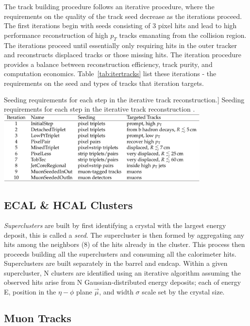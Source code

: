 The track building procedure follows an iterative procedure, where the requirements on the quality of the track seed decrease as the iterations proceed. The first iterations begin with seeds consisting of 3 pixel hits and lead to high performance reconstruction of high $p_{T}$ tracks emanating from the collision region. The iterations proceed until essentially only requiring hits in the outer tracker and reconstructs displaced tracks or those missing hits. The iteration procedure provides a balance between reconstruction efficiency, track purity, and computation economics. Table~\ref{tab:itertracks} list these iterations - the requirements on the seed and types of tracks that iteration targets.

\begin{table}[hbp!]
\caption
[Seeding requirements for each step in the iterative track reconstruction.]
{Seeding requirements for each step in the iterative track reconstruction \cite{CMS-PRF-14-001}.}
\centering
\includegraphics[width=0.8\textwidth]{figs/itertracks.png}
\label{tab:itertracks}
\end{table}

\subsection{ECAL \& HCAL Clusters}

\textit{Superclusters} are built by first identifying a crystal with the largest energy deposit, this is called a \textit{seed}. The supercluster is then formed by aggregating any hits among the neighbors (8) of the hits already in the cluster. This process then proceeds building all the superclusters and consuming all the calorimeter hits. Superclusters are built separately in the barrel and endcap. Within a given supercluster, N clusters are identified using an iterative algorithm assuming the observed hits arise from N Gaussian-distributed energy deposits; each of energy E, position in the $\eta-\phi$ plane $\vec{\mu}$, and width $\sigma$ scale set by the crystal size.

\subsection{Muon Tracks}


